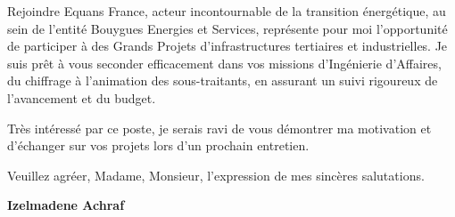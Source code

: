 \documentclass[10pt,a4paper]{altacv}
\begin{document}
\vspace{0.4cm}

Rejoindre Equans France, acteur incontournable de la transition énergétique, au sein de l'entité Bouygues Energies et Services, représente pour moi l'opportunité de participer à des Grands Projets d'infrastructures tertiaires et industrielles. Je suis prêt à vous seconder efficacement dans vos missions d'Ingénierie d'Affaires, du chiffrage à l'animation des sous-traitants, en assurant un suivi rigoureux de l'avancement et du budget.

\vspace{0.4cm}

Très intéressé par ce poste, je serais ravi de vous démontrer ma motivation et d'échanger sur vos projets lors d'un prochain entretien.

\vspace{0.5cm}

Veuillez agréer, Madame, Monsieur, l'expression de mes sincères salutations.

\vfill

\begin{flushright}
  \Large\color{emphasis}\textbf{Izelmadene Achraf}
\end{flushright}
\end{document}
